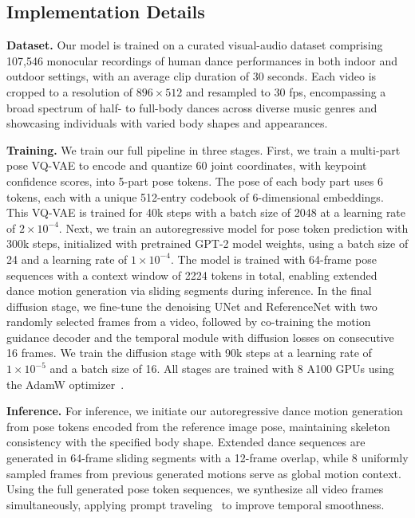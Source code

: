 \subsection{Implementation Details}
\noindent\textbf{Dataset.} Our model is trained on a curated visual-audio dataset comprising 107,546 monocular recordings of human dance performances in both indoor and outdoor settings, with an average clip duration of 30 seconds. Each video is cropped to a resolution of $896\times512$ and resampled to $30$ fps, encompassing a broad spectrum of half- to full-body dances across diverse music genres and showcasing individuals with varied body shapes and appearances.

\noindent\textbf{Training.} We train our full pipeline in three stages. First, we train a multi-part pose VQ-VAE to encode and quantize 60 joint coordinates, with keypoint confidence scores, into 5-part pose tokens. The pose of each body part uses 6 tokens, each with a unique 512-entry codebook of 6-dimensional embeddings. This VQ-VAE is trained for 40k steps with a batch size of 2048 at a learning rate of $2\times10^{-4}$.  Next, we train an autoregressive model for pose token prediction with 300k steps, initialized with pretrained GPT-2 model weights, using a batch size of 24 and a learning rate of $1\times10^{-4}$. The model is trained with 64-frame pose sequences with a context window of 2224 tokens in total, enabling extended dance motion generation via sliding segments during inference. In the final diffusion stage, we fine-tune the denoising UNet and ReferenceNet with two randomly selected frames from a video, followed by co-training the motion guidance decoder and the temporal module with diffusion losses on consecutive 16 frames. We train the diffusion stage with 90k steps at a learning rate of $1\times10^{-5}$ and a batch size of 16. All stages are trained with 8 A100 GPUs using the AdamW optimizer~\cite{yao2021adahessian}. 

\noindent\textbf{Inference.} For inference, we initiate our autoregressive dance motion generation from pose tokens encoded from the reference image pose, maintaining skeleton consistency with the specified body shape. Extended dance sequences are generated in 64-frame sliding segments with a 12-frame overlap, while 8 uniformly sampled frames from previous generated motions serve as global motion context. Using the full generated pose token sequences, we synthesize all video frames simultaneously, applying prompt traveling~\cite{tseng2022edge} to improve temporal smoothness.

